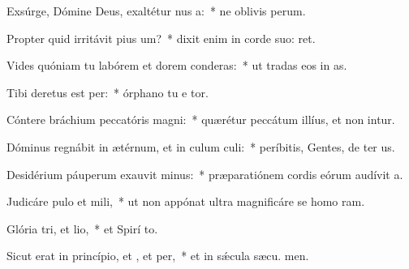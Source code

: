\item Exsúrge, Dómine Deus, exaltétur nus a:~* ne oblivis perum.
\item Propter quid irritávit pius um?~* dixit enim in corde suo:  ret.
\item Vides quóniam tu labórem et dorem conderas:~* ut tradas eos in  as.
\item Tibi deretus est per:~* órphano tu e tor.
\item Cóntere bráchium peccatóris  magni:~* quærétur peccátum illíus, et non intur.
\item Dóminus regnábit in ætérnum, et in culum culi:~* períbitis, Gentes, de ter us.
\item Desidérium páuperum exauvit minus:~* præparatiónem cordis eórum audívit  a.
\item Judicáre pulo et mili,~* ut non appónat ultra magnificáre se homo  ram.
\item Glória tri, et lio,~* et Spirí to.
\item Sicut erat in princípio, et , et per,~* et in sǽcula sæcu. men.
